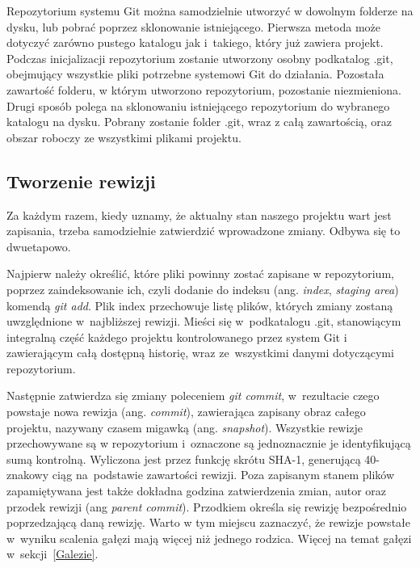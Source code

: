 \documentclass[12pt,a4paper,polish,thesis]{dcsbook}
\begin{document}
	Repozytorium systemu Git można samodzielnie utworzyć w dowolnym folderze na dysku, lub pobrać poprzez sklonowanie istniejącego. Pierwsza metoda może dotyczyć zarówno pustego katalogu jak i~takiego, który już zawiera projekt. Podczas inicjalizacji repozytorium zostanie utworzony osobny podkatalog .git, obejmujący wszystkie pliki potrzebne systemowi Git do działania. Pozostała zawartość folderu, w którym utworzono repozytorium, pozostanie niezmieniona. Drugi sposób polega na sklonowaniu istniejącego repozytorium do wybranego katalogu na dysku. Pobrany zostanie folder .git, wraz z całą zawartością, oraz obszar roboczy ze wszystkimi plikami projektu.

	\subsection{Tworzenie rewizji}
	Za każdym razem, kiedy uznamy, że aktualny stan naszego projektu wart jest zapisania, trzeba samodzielnie zatwierdzić wprowadzone zmiany. Odbywa się to dwuetapowo.

	Najpierw należy określić, które pliki powinny zostać zapisane w repozytorium, poprzez zaindeksowanie ich, czyli dodanie do indeksu (ang. \textit{index}, \textit{staging area}) komendą \textit{git add}. Plik index przechowuje listę plików, których zmiany zostaną uwzględnione w~najbliższej rewizji. Mieści się w~podkatalogu .git, stanowiącym integralną część każdego projektu kontrolowanego przez system Git i zawierającym całą dostępną historię, wraz ze~wszystkimi danymi dotyczącymi repozytorium.

	Następnie zatwierdza się zmiany poleceniem \textit{git commit}, w~rezultacie czego powstaje nowa rewizja (ang. \textit{commit}), zawierająca zapisany obraz całego projektu, nazywany czasem migawką (ang. \textit{snapshot}). Wszystkie rewizje przechowywane są w repozytorium i~oznaczone są jednoznacznie je identyfikującą sumą kontrolną. Wyliczona jest przez funkcję skrótu \mbox{SHA-1}, generującą 40-znakowy ciąg na~podstawie zawartości rewizji. Poza zapisanym stanem plików zapamiętywana jest także dokładna godzina zatwierdzenia zmian, autor oraz przodek rewizji (ang \textit{parent commit}). Przodkiem określa się rewizję bezpośrednio poprzedzającą daną rewizję. Warto w tym miejscu zaznaczyć, że rewizje powstałe w~wyniku scalenia gałęzi mają więcej niż jednego rodzica. Więcej na temat gałęzi w~sekcji~\ref{Galezie}.
\end{document}
